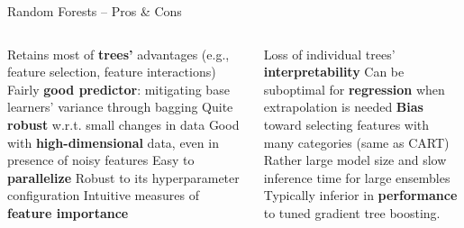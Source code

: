 \begin{frame}{Random Forests -- Pros \& Cons}

\begin{columns}[onlytextwidth]
  \begin{column}{0.5\textwidth}
    \footnotesize
    \begin{itemize}
      \positem Retains most of \textbf{trees'} advantages (e.g., feature selection, feature interactions)
      \positem Fairly \textbf{good predictor}: mitigating base learners' variance through bagging
      \positem Quite \textbf{robust} w.r.t. small changes in data
      \positem Good with \textbf{high-dimensional} data, even in presence of noisy features
      \positem Easy to \textbf{parallelize}
      \positem Robust to its hyperparameter configuration
      \positem Intuitive measures of \textbf{feature importance}
    \end{itemize}
  \end{column}
  \begin{column}{0.5\textwidth}
    \footnotesize
    \begin{itemize}
      \negitem Loss of individual trees' \textbf{interpretability}
      \negitem Can be suboptimal for \textbf{regression} when extrapolation is needed
      \negitem \textbf{Bias} toward selecting features with many categories (same as CART)
      \negitem Rather large model size and slow inference time for large ensembles
      \negitem Typically inferior in \textbf{performance} to tuned gradient tree boosting.
    \end{itemize}
  \end{column}
\end{columns}

\end{frame}